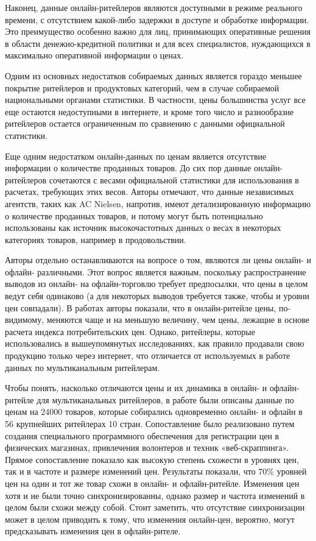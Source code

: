 Наконец, данные онлайн-ритейлеров являются доступными в режиме реального времени, с отсутствием какой-либо задержки в доступе и обработке информации. Это преимущество особенно важно для лиц, принимающих оперативные решения в области денежно-кредитной политики и для всех специалистов, нуждающихся в максимально оперативной информации о ценах.

Одним из основных недостатков собираемых данных является гораздо меньшее покрытие ритейлеров и продуктовых категорий, чем в случае собираемой национальными органами статистики. В частности, цены большинства услуг все еще остаются недоступными в интернете, и кроме того число и разнообразие ритейлеров остается ограниченным по сравнению с данными официальной статистики.

Еще одним недостатком онлайн-данных по ценам является отсутствие информации о количестве проданных товаров. До сих пор данные онлайн-ритейлеров сочетаются с весами официальной статистики для использования в расчетах, требующих этих весов. Авторы отмечают, что данные независимых агентств, таких как AC Nielsen, напротив, имеют детализированную информацию о количестве проданных товаров, и потому могут быть потенциально использованы как источник высокочастотных данных о весах в некоторых категориях товаров, например в продовольствии.

Авторы отдельно останавливаются на вопросе о том, являются ли цены онлайн- и офлайн- различными. Этот вопрос является важным, поскольку распространение выводов из онлайн- на офлайн-торговлю требует предпосылки, что цены в целом ведут себя одинаково (а для некоторых выводов требуется также, чтобы и уровни цен совпадали). В работах \cite{brynjolfsson2000frictionless, ellison2009search, gorodnichenko2018price} авторы показали, что в онлайн-ритейле цены, по-видимому, меняются чаще и на меньшую величину, чем цены, лежащие в основе расчета индекса потребительских цен. Однако, ритейлеры, которые использовались в вышеупомянутых исследованиях, как правило продавали свою продукцию только через интернет, что отличается от используемых в работе данных по мультиканальным ритейлерам.

Чтобы понять, насколько отличаются цены и их динамика в онлайн- и офлайн-ритейле для мультиканальных ритейлеров, в работе \cite{cavallo2016online} были описаны данные по ценам на 24000 товаров, которые собирались одновременно онлайн- и офлайн в 56 крупнейших ритейлерах 10 стран. Сопоставление было реализовано путем создания специального программного обеспечения для регистрации цен в физических магазинах, привлечения волонтеров и техник «веб-скраппинга». Прямое сопоставление показало как высокую степень схожести в уровнях цен, так и в частоте и размере изменений цен. Результаты показали, что 70\% уровней цен на один и тот же товар схожи в онлайн- и офлайн-ритейле. Изменения цен хотя и не были точно синхронизированны, однако размер и частота изменений в целом были схожи между собой. Стоит заметить, что отсутствие синхронизации может в целом приводить к тому, что изменения онлайн-цен, вероятно, могут предсказывать изменения цен в офлайн-рителе.

